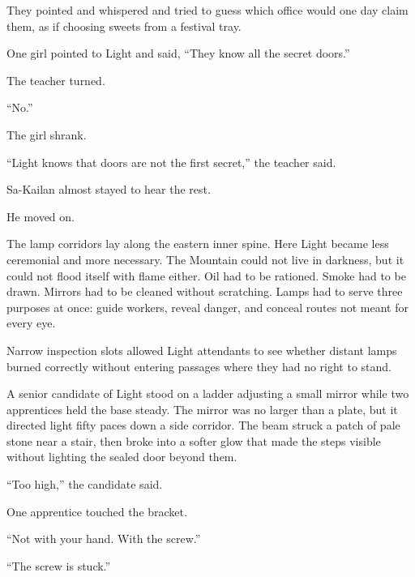 They pointed and whispered and tried to guess which office would one day claim them, as if choosing sweets from a festival tray.\par

One girl pointed to Light and said, “They know all the secret doors.”\par

The teacher turned.\par

“No.”\par

The girl shrank.\par

“Light knows that doors are not the first secret,” the teacher said.\par

Sa-Kailan almost stayed to hear the rest.\par

He moved on.\par

The lamp corridors lay along the eastern inner spine.
Here Light became less ceremonial and more necessary.
The Mountain could not live in darkness, but it could not flood itself with flame either.
Oil had to be rationed.
Smoke had to be drawn.
Mirrors had to be cleaned without scratching.
Lamps had to serve three purposes at once: guide workers, reveal danger, and conceal routes not meant for every eye.\par

Narrow inspection slots allowed Light attendants to see whether distant lamps burned correctly without entering passages where they had no right to stand.\par

A senior candidate of Light stood on a ladder adjusting a small mirror while two apprentices held the base steady.
The mirror was no larger than a plate, but it directed light fifty paces down a side corridor.
The beam struck a patch of pale stone near a stair, then broke into a softer glow that made the steps visible without lighting the sealed door beyond them.\par

“Too high,” the candidate said.\par

One apprentice touched the bracket.\par

“Not with your hand.
With the screw.”\par

“The screw is stuck.”\par

